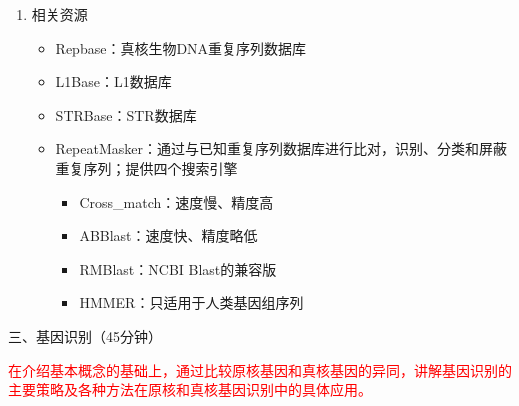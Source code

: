 \documentclass{TIJMUjiaoanLL}
\begin{document}
\begin{enumerate}
  \item 相关资源
    \begin{itemize}
      \item Repbase：真核生物DNA重复序列数据库
      \item L1Base：L1数据库
      \item STRBase：STR数据库
      \item RepeatMasker：通过与已知重复序列数据库进行比对，识别、分类和屏蔽重复序列；提供四个搜索引擎
	\begin{itemize}
	  \item Cross\_match：速度慢、精度高
	  \item ABBlast：速度快、精度略低
	  \item RMBlast：NCBI Blast的兼容版
	  \item HMMER：只适用于人类基因组序列
	\end{itemize}
    \end{itemize}
\end{enumerate}


\otherTail
\newpage
\otherHeader


\noindent
三、基因识别（45分钟）

\textcolor{red}{在介绍基本概念的基础上，通过比较原核基因和真核基因的异同，讲解基因识别的主要策略及各种方法在原核和真核基因识别中的具体应用。}
\end{document}
